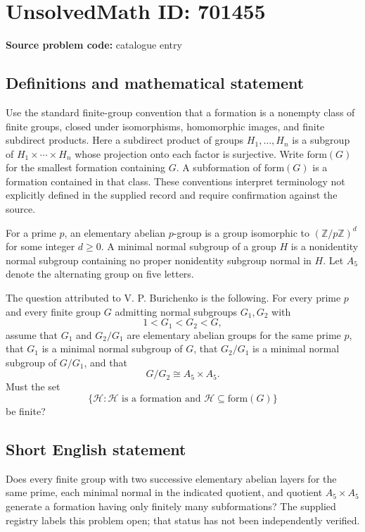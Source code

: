 \documentclass[11pt]{article}
\newcommand{\Z}{\mathbb{Z}}
\begin{document}
\section*{UnsolvedMath ID: 701455}
\textbf{Source problem code:} catalogue entry
\subsection{Definitions and mathematical statement}
Use the standard finite-group convention that a formation is a nonempty class of finite groups, closed under isomorphisms, homomorphic images, and finite subdirect products. Here a subdirect product of groups \(H_1,\ldots,H_n\) is a subgroup of \(H_1\times\cdots\times H_n\) whose projection onto each factor is surjective. Write \(\mathrm{form}(G)\) for the smallest formation containing \(G\). A subformation of \(\mathrm{form}(G)\) is a formation contained in that class. These conventions interpret terminology not explicitly defined in the supplied record and require confirmation against the source.

For a prime \(p\), an elementary abelian \(p\)-group is a group isomorphic to \((\Z/p\Z)^d\) for some integer \(d\geq 0\). A minimal normal subgroup of a group \(H\) is a nonidentity normal subgroup containing no proper nonidentity subgroup normal in \(H\). Let \(A_5\) denote the alternating group on five letters.

The question attributed to V. P. Burichenko is the following. For every prime \(p\) and every finite group \(G\) admitting normal subgroups \(G_1,G_2\) with
\[
1<G_1<G_2<G,
\]
assume that \(G_1\) and \(G_2/G_1\) are elementary abelian groups for the same prime \(p\), that \(G_1\) is a minimal normal subgroup of \(G\), that \(G_2/G_1\) is a minimal normal subgroup of \(G/G_1\), and that
\[
G/G_2\cong A_5\times A_5.
\]
Must the set
\[
\bigl\{\mathcal H:\mathcal H\text{ is a formation and }\mathcal H\subseteq\mathrm{form}(G)\bigr\}
\]
be finite?
\subsection{Short English statement}
Does every finite group with two successive elementary abelian layers for the same prime, each minimal normal in the indicated quotient, and quotient \(A_5\times A_5\) generate a formation having only finitely many subformations? The supplied registry labels this problem open; that status has not been independently verified.
\end{document}
